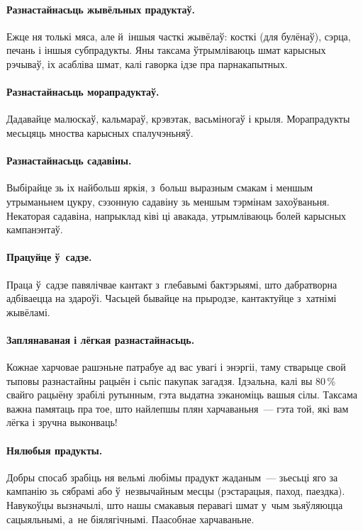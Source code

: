 \paragraph{Разнастайнасьць жывёльных прадуктаў.}
Ежце ня толькі мяса, але й~іншыя часткі жывёлаў: косткі (для булёнаў), сэрца, печань і іншыя субпрадукты. Яны таксама ўтрымліваюць шмат карысных рэчываў, іх асабліва шмат, калі гаворка ідзе пра парнакапытных.


\paragraph{Разнастайнасьць морапрадуктаў.}
Дадавайце малюскаў, кальмараў, крэвэтак, васьміногаў і крыля. Морапрадукты месьцяць мноства карысных спалучэньняў.

\paragraph{Разнастайнасьць садавіны.}
Выбірайце зь іх найбольш яркія, з~больш выразным смакам і меншым утрыманьнем цукру, сэзонную садавіну зь меншым тэрмінам захоўваньня. Некаторая садавіна, напрыклад ківі ці авакада, утрымліваюць болей карысных кампанэнтаў.

\paragraph{Працуйце ў~садзе.}
Праца ў~садзе павялічвае кантакт з~глебавымі бактэрыямі, што дабратворна адбіваецца на здароўі. Часьцей бывайце на прыродзе, кантактуйце з~хатнімі жывёламі.

\paragraph{Заплянаваная і лёгкая разнастайнасьць.}
Кожнае харчовае рашэньне патрабуе ад вас увагі і энэргіі, таму стварыце свой тыповы разнастайны рацыён і сьпіс пакупак загадзя. Ідэальна, калі вы 80\,\% свайго рацыёну зрабілі рутынным, гэта выдатна зэканоміць вашыя сілы. Таксама важна памятаць пра тое, што найлепшы плян харчаваньня~--- гэта той, які вам лёгка і зручна выконваць!

\paragraph{Нялюбыя прадукты.}
Добры спосаб зрабіць ня вельмі любімы прадукт жаданым~--- зьесьці яго за кампанію зь сябрамі або ў~незвычайным месцы (рэстарацыя, паход, паездка). Навукоўцы вызначылі, што нашы смакавыя перавагі шмат у~чым зьяўляюцца сацыяльнымі, а~не біялягічнымі.
Паасобнае харчаваньне.

